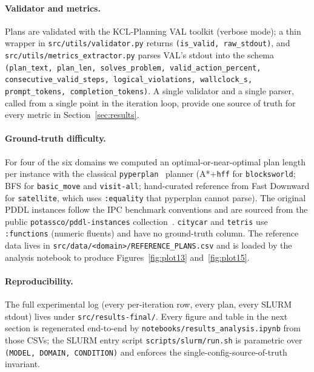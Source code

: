 \paragraph{Validator and metrics.}
Plans are validated with the KCL-Planning VAL toolkit (verbose mode);
a thin wrapper in \texttt{src/utils/validator.py} returns
\texttt{(is\_valid, raw\_stdout)}, and
\texttt{src/utils/metrics\_extractor.py} parses VAL's stdout into the
schema \texttt{(plan\_text, plan\_len, solves\_problem,
valid\_action\_percent, consecutive\_valid\_steps,
logical\_violations, wallclock\_s, prompt\_tokens, completion\_tokens)}.
A single validator and a single parser, called from a single point in
the iteration loop, provide one source of truth for every metric in
Section~\ref{sec:results}.

\paragraph{Ground-truth difficulty.}
For four of the six domains we computed an optimal-or-near-optimal
plan length per instance with the classical
\texttt{pyperplan}~\cite{pyperplan} planner
(A*+\texttt{hff} for \texttt{blocksworld}; BFS for \texttt{basic\_move}
and \texttt{visit-all}; hand-curated reference from Fast Downward for
\texttt{satellite}, which uses \texttt{:equality} that pyperplan
cannot parse). The original PDDL instances follow the IPC
benchmark conventions and are sourced from the public
\texttt{potassco/pddl-instances} collection~\cite{ipc-instances}. \texttt{citycar} and \texttt{tetris} use
\texttt{:functions} (numeric fluents) and have no ground-truth column.
The reference data lives in
\texttt{src/data/<domain>/REFERENCE\_PLANS.csv} and is loaded by the
analysis notebook to produce Figures~\ref{fig:plot13}
and~\ref{fig:plot15}.

\paragraph{Reproducibility.}
The full experimental log (every per-iteration row, every plan, every
SLURM stdout) lives under \texttt{src/results-final/}. Every figure
and table in the next section is regenerated end-to-end by
\texttt{notebooks/results\_analysis.ipynb} from those CSVs; the SLURM
entry script \texttt{scripts/slurm/run.sh} is parametric over
\texttt{(MODEL, DOMAIN, CONDITION)} and enforces the
single-config-source-of-truth invariant.
